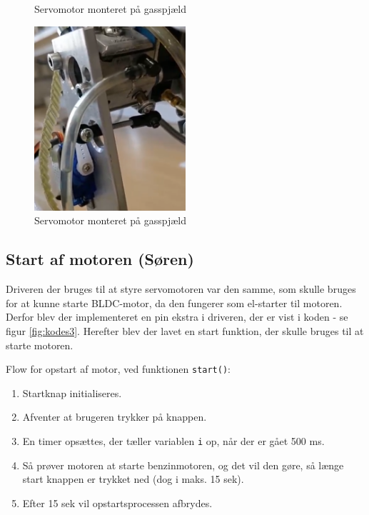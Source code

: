 \begin{figure}[h]
  \centering
  
  \caption{Servomotor monteret på gasspjæld}
  \label{fig:kodes2}
\end{figure}

  
\begin{figure}[h]
  \centering
  \includegraphics[width=0.5\textwidth]{./figurer/mots5.png}
  \caption{Servomotor monteret på gasspjæld}
  \label{fig:mots5}
\end{figure}

  
\subsection{Start af motoren (Søren)}
\label{sec:start-af-motoren}

Driveren der bruges til at styre servomotoren var den samme, som skulle bruges for at kunne starte BLDC-motor, da den fungerer som el-starter til motoren. Derfor blev der implementeret en pin ekstra i driveren, der er vist i koden - se figur \ref{fig:kodes3}. Herefter blev der lavet en start funktion, der skulle bruges til at starte motoren.

Flow for opstart af motor, ved funktionen \lstinline{start()}:

\begin{enumerate}
\item Startknap initialiseres.
\item Afventer at brugeren trykker på knappen.
\item En timer opsættes, der tæller variablen \lstinline{i} op, når der er gået 500 ms.
\item Så prøver motoren at starte benzinmotoren, og det vil den gøre, så længe start knappen er trykket ned (dog i maks. 15 sek).
\item Efter 15 sek vil opstartsprocessen afbrydes.
\end{enumerate}

